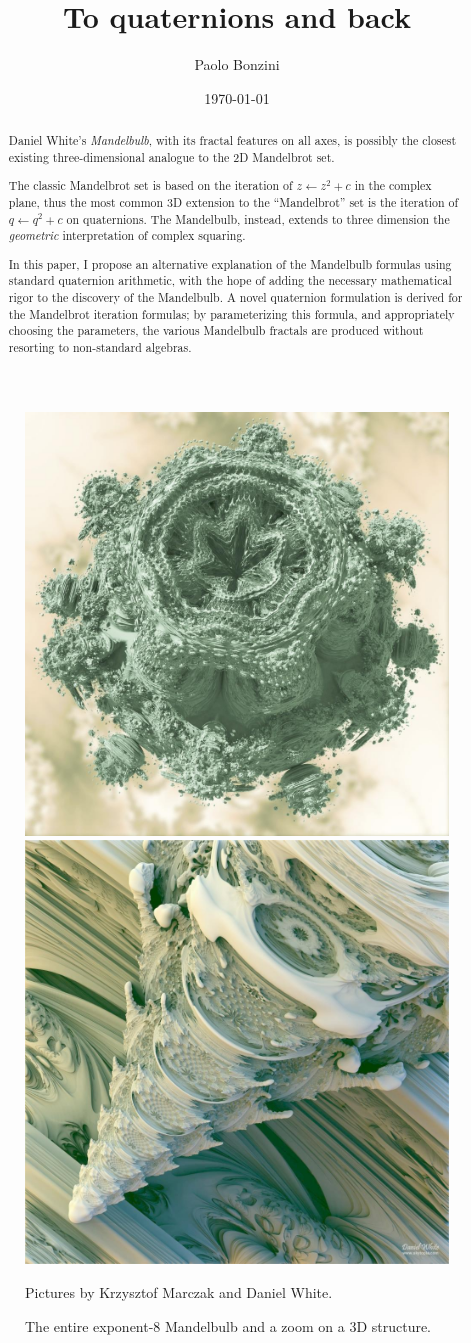 \documentclass{article}
\title{To quaternions and back}
\date{\today}
\author{Paolo Bonzini}
\begin{document}
\maketitle


\thispagestyle{empty}
\begin{abstract}
  Daniel White's \emph{Mandelbulb}, with its fractal features on all axes,
  is possibly the closest existing three-dimensional analogue to the 2D
  Mandelbrot set.

  The classic Mandelbrot set is based on the iteration of $z\leftarrow
  z^2+c$ in the complex plane, thus the most common 3D extension
  to the ``Mandelbrot'' set is the iteration of $q\leftarrow q^2+c$
  on quaternions.  The Mandelbulb, instead, extends to three dimension
  the \emph{geometric} interpretation of complex squaring.

  In this paper, I propose an alternative explanation of the Mandelbulb
  formulas using standard quaternion arithmetic, with the hope of adding
  the necessary mathematical rigor to the discovery of the Mandelbulb.
  A novel quaternion formulation is derived for the Mandelbrot iteration
  formulas; by parameterizing this formula, and appropriately choosing
  the parameters, the various Mandelbulb fractals are produced without
  resorting to non-standard algebras.
\end{abstract}

\begin{figure}[!b]
\includegraphics[width=0.45\linewidth]{mbulb2.jpg}
\hfill
\includegraphics[width=0.45\linewidth]{mbulb.jpg}

\centering
\caption{The entire exponent-8 Mandelbulb and a zoom on a 3D structure.}
\label{fig:mbulb8}
Pictures by Krzysztof Marczak and Daniel White.
\end{figure}
\end{document}
